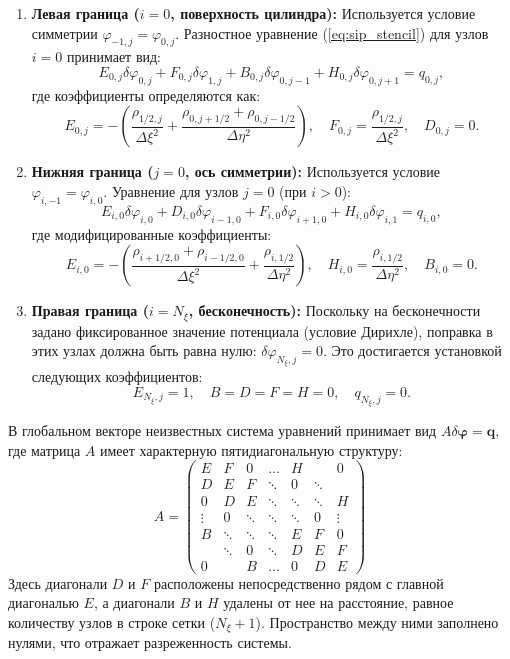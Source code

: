 \documentclass[a4paper,12pt]{article}
\begin{document}
	\begin{enumerate}
		\item \textbf{Левая граница ($i=0$, поверхность цилиндра):} 
		Используется условие симметрии $\varphi_{-1,j} = \varphi_{0,j}$. Разностное уравнение (\ref{eq:sip_stencil}) для узлов $i=0$ принимает вид:
		\[ E_{0,j} \delta\varphi_{0,j} + F_{0,j} \delta\varphi_{1,j} + B_{0,j} \delta\varphi_{0,j-1} + H_{0,j} \delta\varphi_{0,j+1} = q_{0,j}, \]
		где коэффициенты определяются как:
		\[ E_{0,j} = -\left( \frac{\rho_{1/2,j}}{\Delta \xi^2} + \frac{\rho_{0,j+1/2} + \rho_{0,j-1/2}}{\Delta \eta^2} \right), \quad F_{0,j} = \frac{\rho_{1/2,j}}{\Delta \xi^2}, \quad D_{0,j} = 0. \]
		
		\item \textbf{Нижняя граница ($j=0$, ось симметрии):} 
		Используется условие $\varphi_{i,-1} = \varphi_{i,0}$. Уравнение для узлов $j=0$ (при $i > 0$):
		\[ E_{i,0} \delta\varphi_{i,0} + D_{i,0} \delta\varphi_{i-1,0} + F_{i,0} \delta\varphi_{i+1,0} + H_{i,0} \delta\varphi_{i,1} = q_{i,0}, \]
		где модифицированные коэффициенты:
		\[ E_{i,0} = -\left( \frac{\rho_{i+1/2,0} + \rho_{i-1/2,0}}{\Delta \xi^2} + \frac{\rho_{i,1/2}}{\Delta \eta^2} \right), \quad H_{i,0} = \frac{\rho_{i,1/2}}{\Delta \eta^2}, \quad B_{i,0} = 0. \]
		
		\item \textbf{Правая граница ($i=N_\xi$, бесконечность):} 
		Поскольку на бесконечности задано фиксированное значение потенциала (условие Дирихле), поправка в этих узлах должна быть равна нулю: $\delta \varphi_{N_\xi,j} = 0$. Это достигается установкой следующих коэффициентов:
		\[ E_{N_\xi,j} = 1, \quad B = D = F = H = 0, \quad q_{N_\xi,j} = 0. \]
	\end{enumerate}



	В глобальном векторе неизвестных система уравнений принимает вид $A \delta \boldsymbol{\varphi} = \mathbf{q}$, где матрица $A$ имеет характерную пятидиагональную структуру:
	\[
	A = \begin{pmatrix}
		E & F & 0 & \dots & H & & 0 \\
		D & E & F & \ddots & 0 & \ddots & \\
		0 & D & E & \ddots & \ddots & \ddots & H \\
		\vdots & 0 & \ddots & \ddots & \ddots & 0 & \vdots \\
		B & \ddots & \ddots & \ddots & E & F & 0 \\
		& \ddots & 0 & \ddots & D & E & F \\
		0 & & B & \dots & 0 & D & E 
	\end{pmatrix}
	\]
	Здесь диагонали $D$ и $F$ расположены непосредственно рядом с главной диагональю $E$, а диагонали $B$ и $H$ удалены от нее на расстояние, равное количеству узлов в строке сетки ($N_\xi+1$). Пространство между ними заполнено нулями, что отражает разреженность системы.
\end{document}
